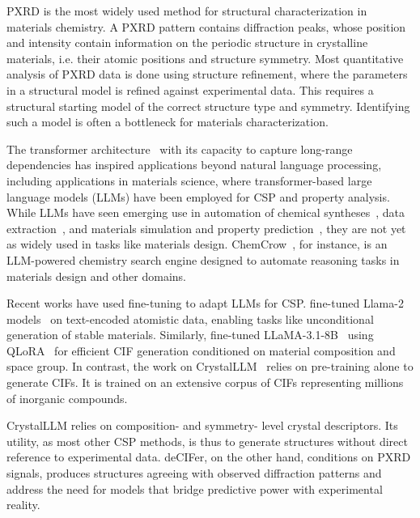 PXRD is the most widely used method for structural characterization in materials chemistry. A PXRD pattern contains diffraction peaks, whose position and intensity contain information on the periodic structure in crystalline materials, i.e. their atomic positions and structure symmetry. Most quantitative analysis of PXRD data is done using structure refinement, where the parameters in a structural model is refined against experimental data. This requires a structural starting model of the correct structure type and symmetry. Identifying such a model is often a bottleneck for materials characterization.

The transformer architecture~\cite{vaswani2017attentionneed} with its capacity to capture long-range dependencies has inspired applications beyond natural language processing, including applications in materials science, where transformer-based large language models (LLMs) have been employed for CSP and property analysis. While LLMs have seen emerging use in automation of chemical syntheses~\cite{hocky2022natural, szymanski2023autonomous, m2024augmenting}, data extraction~\cite{gupta2022matscibert, dagdelen2024structured, polak2024extracting, schilling2025text}, and materials simulation and property prediction~\cite{zhang_dpa-2_2024, rubungo2024llmmatbench, jablonka2024leveraging}, they are not yet as widely used in tasks like materials design. ChemCrow~\cite{m2024augmenting}, for instance, is an LLM-powered chemistry search engine designed to automate reasoning tasks in materials design and other domains.

Recent works have used fine-tuning to adapt LLMs for CSP. \citet{gruver2024finetuned} fine-tuned Llama-2 models~\cite{touvron2023llama} on text-encoded atomistic data, enabling tasks like unconditional generation of stable materials. Similarly, \citet{mohanty2024crystext} fine-tuned LLaMA-3.1-8B~\cite{dubey2024llama} using QLoRA~\cite{dettmers2024qlora} for efficient CIF generation conditioned on material composition and space group. In contrast, the work on CrystalLLM~\cite{antunes2024crystalstructuregenerationautoregressive} relies on pre-training alone to generate CIFs. It is trained on an extensive corpus of CIFs representing millions of inorganic compounds. 

CrystalLLM relies on composition- and symmetry- level crystal descriptors. Its utility, as most other CSP methods, is thus to generate structures without direct reference to experimental data. deCIFer, on the other hand, conditions on PXRD signals, produces structures agreeing with observed diffraction patterns and address the need for models that bridge predictive power with experimental reality.

